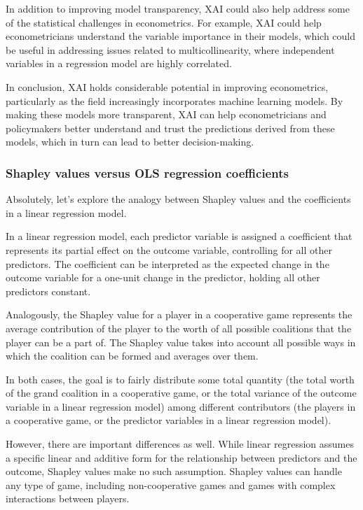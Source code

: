 \documentclass[
  letterpaper,
  DIV=11,
  numbers=noendperiod]{scrartcl}
\begin{document}
In addition to improving model transparency, XAI could also help address
some of the statistical challenges in econometrics. For example, XAI
could help econometricians understand the variable importance in their
models, which could be useful in addressing issues related to
multicollinearity, where independent variables in a regression model are
highly correlated.

In conclusion, XAI holds considerable potential in improving
econometrics, particularly as the field increasingly incorporates
machine learning models. By making these models more transparent, XAI
can help econometricians and policymakers better understand and trust
the predictions derived from these models, which in turn can lead to
better decision-making.

\hypertarget{shapley-values-versus-ols-regression-coefficients}{%
\subsubsection{Shapley values versus OLS regression
coefficients}\label{shapley-values-versus-ols-regression-coefficients}}

Absolutely, let's explore the analogy between Shapley values and the
coefficients in a linear regression model.

In a linear regression model, each predictor variable is assigned a
coefficient that represents its partial effect on the outcome variable,
controlling for all other predictors. The coefficient can be interpreted
as the expected change in the outcome variable for a one-unit change in
the predictor, holding all other predictors constant.

Analogously, the Shapley value for a player in a cooperative game
represents the average contribution of the player to the worth of all
possible coalitions that the player can be a part of. The Shapley value
takes into account all possible ways in which the coalition can be
formed and averages over them.

In both cases, the goal is to fairly distribute some total quantity (the
total worth of the grand coalition in a cooperative game, or the total
variance of the outcome variable in a linear regression model) among
different contributors (the players in a cooperative game, or the
predictor variables in a linear regression model).

However, there are important differences as well. While linear
regression assumes a specific linear and additive form for the
relationship between predictors and the outcome, Shapley values make no
such assumption. Shapley values can handle any type of game, including
non-cooperative games and games with complex interactions between
players.
\end{document}
